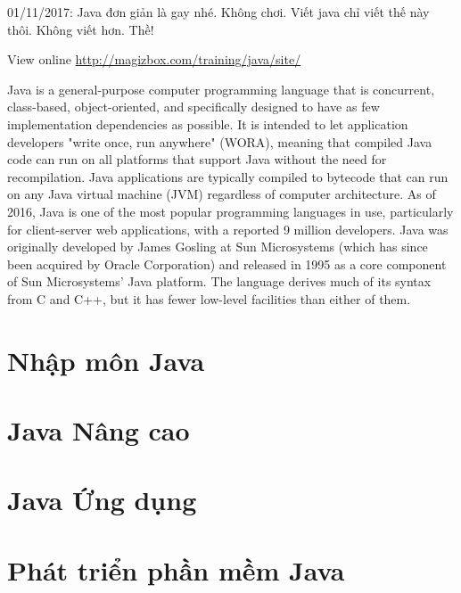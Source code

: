 01/11/2017: Java đơn giản là gay nhé. Không chơi. Viết java chỉ viết thế này thôi. Không viết hơn. Thề!

View online \href{http://magizbox.com/training/java/site/}{http://magizbox.com/training/java/site/}

Java is a general-purpose computer programming language that is concurrent, class-based, object-oriented, and specifically designed to have as few implementation dependencies as possible. It is intended to let application developers "write once, run anywhere" (WORA), meaning that compiled Java code can run on all platforms that support Java without the need for recompilation. Java applications are typically compiled to bytecode that can run on any Java virtual machine (JVM) regardless of computer architecture. As of 2016, Java is one of the most popular programming languages in use, particularly for client-server web applications, with a reported 9 million developers. Java was originally developed by James Gosling at Sun Microsystems (which has since been acquired by Oracle Corporation) and released in 1995 as a core component of Sun Microsystems' Java platform. The language derives much of its syntax from C and C++, but it has fewer low-level facilities than either of them.

\part{Nhập môn Java}







\part{Java Nâng cao}

\part{Java Ứng dụng}

\part{Phát triển phần mềm Java}





























